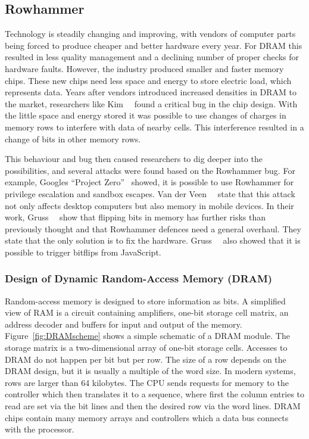 \subsection{Rowhammer}

Technology is steadily changing and improving, with vendors of computer parts
being forced to produce cheaper and better hardware every year. For DRAM this
resulted in less quality management and a declining number of proper checks for
hardware faults. However, the industry produced smaller and faster memory chips.
These new chips need less space and energy to store electric load, which
represents data. Years after vendors introduced increased densities in DRAM to
the market, researchers like Kim~\etal~\cite{rowhammergeneral} found a critical
bug in the chip design. With the little space and energy stored it was possible
to use changes of charges in memory rows to interfere with data of nearby cells.
This interference resulted in a change of bits in other memory rows.

This behaviour and bug then caused researchers to dig deeper into the
possibilities, and several attacks were found based on the Rowhammer bug. For
example, Google\textquotesingle s ``Project Zero''~\cite{projectzerorow} showed,
it is possible to use Rowhammer for privilege escalation and sandbox escapes.
Van der Veen~\etal~\cite{drammer} state that this attack not only affects
desktop computers but also memory in mobile devices. In their work,
Gruss~\etal~\cite{flipinthewall} show that flipping bits in memory has further
risks than previously thought and that Rowhammer defences need a general
overhaul. They state that the only solution is to fix the hardware.
Gruss~\etal~\cite{rowhammerjs} also showed that it is possible to trigger
bitflips from JavaScript.

\subsubsection{Design of Dynamic Random-Access Memory (DRAM)}

Random-access memory is designed to store information as bits. A simplified view
of RAM is a circuit containing amplifiers, one-bit storage cell matrix, an
address decoder and buffers for input and output of the memory.
Figure~\ref{fig:DRAMscheme} shows a simple schematic of a DRAM module. The
storage matrix is a two-dimensional array of one-bit storage cells. Accesses to
DRAM do not happen per bit but per row. The size of a row depends on the DRAM
design, but it is usually a multiple of the word size. In modern systems, rows
are larger than 64 kilobytes. The CPU sends requests for memory to the
controller which then translates it to a sequence, where first the column
entries to read are set via the bit lines and then the desired row via the word
lines. DRAM chips contain many memory arrays and controllers which a data bus
connects with the processor.


